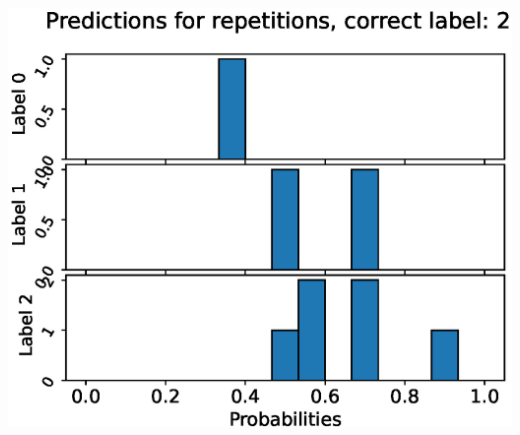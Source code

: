\begin{center}
\begin{minipage}{0.33\textwidth}
  \includegraphics[width=\textwidth]{files/figs/app/hists/kmfp/pr2.eps}
\end{minipage}


\end{center}
